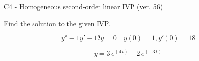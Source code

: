 \begin{exercise}
  \begin{exerciseTitle}C4 - Homogeneous second-order linear IVP (ver. 56)\end{exerciseTitle}
  \begin{exerciseStatement}
    
Find the solution to the given IVP.

    
\[y''-1y'-12y = 0 \hspace{1em} y(0) = 1 , y'(0) = 18\]

  \end{exerciseStatement}
  \begin{exerciseAnswer}
    
\[y= 3 \, e^{\left(4 \, t\right)} - 2 \, e^{\left(-3 \, t\right)}\]

  \end{exerciseAnswer}
\end{exercise}